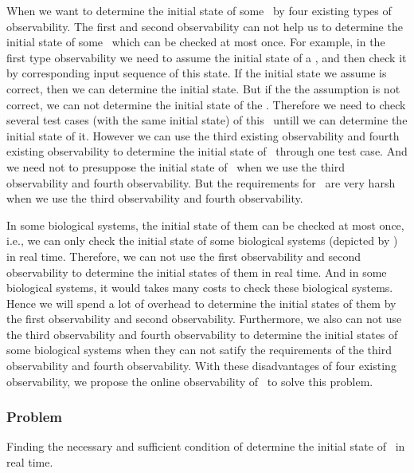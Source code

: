 When we want to determine the initial state of some \BCNs\ by four existing types of observability. The first and second observability can not help us to determine the initial state of some \BCNs\ which can be checked at most once. For example, in the first type observability we need to assume the initial state of a \BCN, and then check it by corresponding input sequence of this state. If the initial state we assume is correct, then we can determine the initial state. But if the the assumption is not correct, we can not determine the initial state of the \BCN. Therefore we need to check several test cases (with the same initial state) of this \BCN\ untill we can determine the initial state of it. However we can use the third existing observability and fourth existing observability to determine the initial state of \BCNs\ through one test case. And we need not to presuppose the initial state of \BCNs\ when we use the third observability and fourth observability. But the requirements for \BCNs\ are very harsh when we use the third observability and fourth observability.
 
In some biological systems, the initial state of them can be checked at most once, i.e., we can only check the initial state of some biological systems (depicted by \BCNs) in real time. Therefore, we can not use the first observability and second observability to determine the initial states of them in real time. And in some biological systems, it would takes many costs to check these biological systems. Hence we will spend a lot of overhead to determine the initial states of them by the first observability and second observability. Furthermore, we also can not use the third observability and fourth observability to determine the initial states of some biological systems when they can not satify the requirements of the third observability and fourth observability. With these disadvantages of four existing observability, we propose the online observability of \BCNs\ to solve this problem.
 \subsubsection*{Problem}
Finding the necessary and sufficient condition of determine the initial state of \BCNs\ in real time.